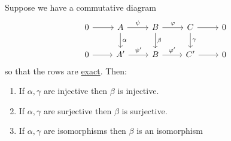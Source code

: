 \begin{lemma}\label{lma:the-short-five-lemma}
	Suppose we have a commutative diagram
	\[
		\begin{tikzcd}
			0 & A & B & C & 0 \\
			0 & {A^\prime} & B & {C^\prime} & 0
			\arrow[from=1-1, to=1-2]
			\arrow["\psi", from=1-2, to=1-3]
			\arrow["\varphi", from=1-3, to=1-4]
			\arrow[from=1-4, to=1-5]
			\arrow["\gamma", from=1-4, to=2-4]
			\arrow[from=2-4, to=2-5]
			\arrow["{\varphi^\prime}", from=2-3, to=2-4]
			\arrow["\beta", from=1-3, to=2-3]
			\arrow["{\psi^\prime}", from=2-2, to=2-3]
			\arrow["\alpha", from=1-2, to=2-2]
			\arrow[from=2-1, to=2-2]
		\end{tikzcd}
	\]
	so that the rows are \hyperref[def:exact-sequence]{exact}. Then:
	\begin{enumerate}[(1)]
		\item If \(\alpha, \gamma\) are injective then \(\beta\) is injective.
		\item If \(\alpha, \gamma\) are surjective then \(\beta\) is surjective.
		\item If \(\alpha, \gamma\) are isomorphisms then \(\beta\) is an isomorphism
	\end{enumerate}
\end{lemma}

